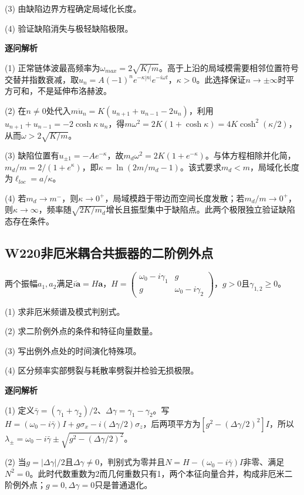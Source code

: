 (3) 由缺陷边界方程确定局域化长度。

(4) 验证缺陷消失与极轻缺陷极限。

\par\textbf{逐问解析}

(1) 正常链体波最高频率为$\omega_{max}=2\sqrt{K/m}$。高于上沿的局域模需要相邻位置符号交替并指数衰减，取$u_n=A(-1)^ne^{-\kappa|n|}e^{-i\omega t}$，$\kappa>0$。此选择保证$n\to\pm\infty$时平方可和，不是延伸布洛赫波。

(2) 在$n\ne0$处代入$m\ddot u_n=K(u_{n+1}+u_{n-1}-2u_n)$，利用$u_{n+1}+u_{n-1}=-2\cosh\kappa\,u_n$，得$m\omega^2=2K(1+\cosh\kappa)=4K\cosh^2(\kappa/2)$，从而$\omega>2\sqrt{K/m}$。

(3) 缺陷位置有$u_{\pm1}=-Ae^{-\kappa}$，故$m_d\omega^2=2K(1+e^{-\kappa})$。与体方程相除并化简，$m_d/m=2/(1+e^\kappa)$，即$\kappa=\ln(2m/m_d-1)$。该式要求$m_d<m$，局域化长度为$\ell_{loc}=a/\kappa$。

(4) 若$m_d\to m^-$，则$\kappa\to0^+$，局域模趋于带边而空间长度发散；若$m_d/m\to0^+$，则$\kappa\to\infty$，频率随$\sqrt{2K/m_d}$增长且振型集中于缺陷点。此两个极限独立验证缺陷态存在条件。

\par\medskip

\subsection*{W220\quad 非厄米耦合共振器的二阶例外点}

两个振幅$a_1,a_2$满足$i\dot{\mathbf a}=H\mathbf a$，$H=\begin{pmatrix}\omega_0-i\gamma_1&g\\g&\omega_0-i\gamma_2\end{pmatrix}$，$g>0$且$\gamma_{1,2}\ge0$。

(1) 求非厄米频谱及模式判别式。

(2) 求二阶例外点的条件和特征向量数量。

(3) 写出例外点处的时间演化特殊项。

(4) 区分频率实部劈裂与耗散率劈裂并检验无损极限。

\par\textbf{逐问解析}

(1) 定义$\bar\gamma=(\gamma_1+\gamma_2)/2$、$\Delta\gamma=\gamma_1-\gamma_2$。写$H=(\omega_0-i\bar\gamma)I+g\sigma_x-i(\Delta\gamma/2)\sigma_z$，后两项平方为$[g^2-(\Delta\gamma/2)^2]I$，所以$\lambda_\pm=\omega_0-i\bar\gamma\pm\sqrt{g^2-(\Delta\gamma/2)^2}$。

(2) 当$g=|\Delta\gamma|/2$且$\Delta\gamma\ne0$，判别式为零并且$N=H-(\omega_0-i\bar\gamma)I$非零、满足$N^2=0$。此时代数重数为2而几何重数只有1，两个本征向量合并，构成非厄米二阶例外点；$g=0,\Delta\gamma=0$只是普通退化。

